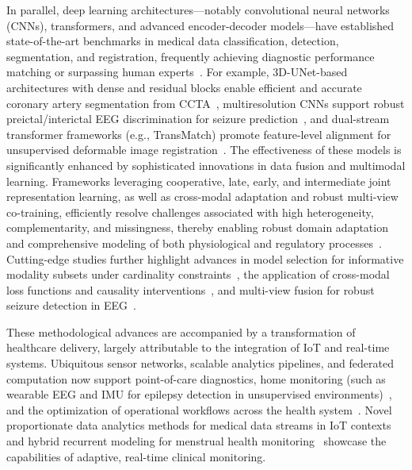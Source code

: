 \documentclass[sigconf]{acmart}
\begin{document}
In parallel, deep learning architectures---notably convolutional neural networks (CNNs), transformers, and advanced encoder-decoder models---have established state-of-the-art benchmarks in medical data classification, detection, segmentation, and registration, frequently achieving diagnostic performance matching or surpassing human experts~\cite{ref40,ref43,ref44,ref49,ref54,ref57,ref60,ref63,ref100}. For example, 3D-UNet-based architectures with dense and residual blocks enable efficient and accurate coronary artery segmentation from CCTA~\cite{ref100}, multiresolution CNNs support robust preictal/interictal EEG discrimination for seizure prediction~\cite{ref102}, and dual-stream transformer frameworks (e.g., TransMatch) promote feature-level alignment for unsupervised deformable image registration~\cite{ref48}. The effectiveness of these models is significantly enhanced by sophisticated innovations in data fusion and multimodal learning. Frameworks leveraging cooperative, late, early, and intermediate joint representation learning, as well as cross-modal adaptation and robust multi-view co-training, efficiently resolve challenges associated with high heterogeneity, complementarity, and missingness, thereby enabling robust domain adaptation and comprehensive modeling of both physiological and regulatory processes~\cite{ref30,ref31,ref32,ref33,ref34,ref35,ref36,ref37,ref38,ref39,ref41,ref47,ref48,ref51,ref64,ref65,ref98,ref102,ref104,ref105}. Cutting-edge studies further highlight advances in model selection for informative modality subsets under cardinality constraints~\cite{ref39}, the application of cross-modal loss functions and causality interventions~\cite{ref31,ref32,ref34}, and multi-view fusion for robust seizure detection in EEG~\cite{ref98}.

These methodological advances are accompanied by a transformation of healthcare delivery, largely attributable to the integration of IoT and real-time systems. Ubiquitous sensor networks, scalable analytics pipelines, and federated computation now support point-of-care diagnostics, home monitoring (such as wearable EEG and IMU for epilepsy detection in unsupervised environments)~\cite{ref24,ref27,ref103,ref106,ref107}, and the optimization of operational workflows across the health system~\cite{ref79,ref81,ref84,ref106}. Novel proportionate data analytics methods for medical data streams in IoT contexts~\cite{ref106} and hybrid recurrent modeling for menstrual health monitoring~\cite{ref107} showcase the capabilities of adaptive, real-time clinical monitoring.
\end{document}

